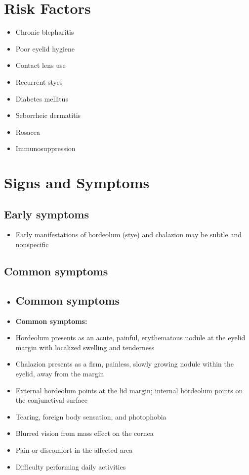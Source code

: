 \section{Risk Factors}

\begin{itemize}[noitemsep]
  \item Chronic blepharitis
  \item Poor eyelid hygiene
  \item Contact lens use
  \item Recurrent styes
  \item Diabetes mellitus
  \item Seborrheic dermatitis
  \item Rosacea
  \item Immunosuppression
\end{itemize}

\section{Signs and Symptoms}

\subsection{Early symptoms}
\begin{itemize}[noitemsep]
  \item Early manifestations of hordeolum (stye) and chalazion may be subtle and nonspecific
\end{itemize}

\subsection{Common symptoms}
\begin{itemize}[noitemsep]
  \item \subsection{Common symptoms}
  \item \textbf{Common symptoms:}
  \item Hordeolum presents as an acute, painful, erythematous nodule at the eyelid margin with localized swelling and tenderness
  \item Chalazion presents as a firm, painless, slowly growing nodule within the eyelid, away from the margin
  \item External hordeolum points at the lid margin; internal hordeolum points on the conjunctival surface
  \item Tearing, foreign body sensation, and photophobia
  \item Blurred vision from mass effect on the cornea
  \item Pain or discomfort in the affected area
  \item Difficulty performing daily activities
\end{itemize}

